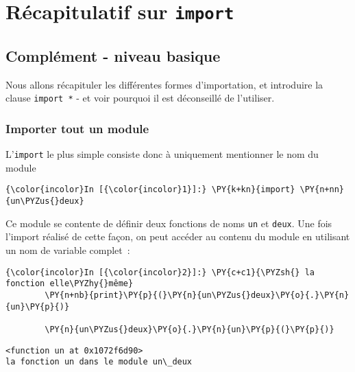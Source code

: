     
    
    
    

    

    \hypertarget{ruxe9capitulatif-sur-import}{%
\section{\texorpdfstring{Récapitulatif sur
\texttt{import}}{Récapitulatif sur import}}\label{ruxe9capitulatif-sur-import}}

    \hypertarget{compluxe9ment---niveau-basique}{%
\subsection{Complément - niveau
basique}\label{compluxe9ment---niveau-basique}}

    Nous allons récapituler les différentes formes d'importation, et
introduire la clause \texttt{import\ *} - et voir pourquoi il est
déconseillé de l'utiliser.

    \hypertarget{importer-tout-un-module}{%
\subsubsection{Importer tout un module}\label{importer-tout-un-module}}

    L'\texttt{import} le plus simple consiste donc à uniquement mentionner
le nom du module

    \begin{Verbatim}[commandchars=\\\{\}]
{\color{incolor}In [{\color{incolor}1}]:} \PY{k+kn}{import} \PY{n+nn}{un\PYZus{}deux}
\end{Verbatim}


    Ce module se contente de définir deux fonctions de noms \texttt{un} et
\texttt{deux}. Une fois l'import réalisé de cette façon, on peut accéder
au contenu du module en utilisant un nom de variable complet~:

    \begin{Verbatim}[commandchars=\\\{\}]
{\color{incolor}In [{\color{incolor}2}]:} \PY{c+c1}{\PYZsh{} la fonction elle\PYZhy{}même}
        \PY{n+nb}{print}\PY{p}{(}\PY{n}{un\PYZus{}deux}\PY{o}{.}\PY{n}{un}\PY{p}{)}
        
        \PY{n}{un\PYZus{}deux}\PY{o}{.}\PY{n}{un}\PY{p}{(}\PY{p}{)}
\end{Verbatim}


    \begin{Verbatim}[commandchars=\\\{\}]
<function un at 0x1072f6d90>
la fonction un dans le module un\_deux

    \end{Verbatim}


